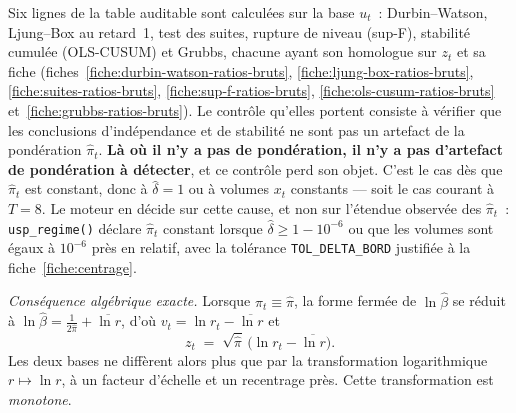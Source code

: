 \documentclass[a4paper,11pt]{article}
\newcommand{\code}[1]{\texttt{\small #1}}
\begin{document}
Six lignes de la table auditable sont calculées sur la base $u_t$~:
Durbin--Watson, Ljung--Box au retard~1, test des suites, rupture de niveau
(sup-F), stabilité cumulée (OLS-CUSUM) et Grubbs, chacune ayant son homologue
sur $z_t$ et sa fiche (fiches~\ref{fiche:durbin-watson-ratios-bruts},
\ref{fiche:ljung-box-ratios-bruts}, \ref{fiche:suites-ratios-bruts},
\ref{fiche:sup-f-ratios-bruts}, \ref{fiche:ols-cusum-ratios-bruts}
et~\ref{fiche:grubbs-ratios-bruts}). Le contrôle qu'elles portent consiste à vérifier que les conclusions
d'indépendance et de stabilité ne sont pas un artefact de la pondération
$\hat\pi_t$. \textbf{Là où il n'y a pas de pondération, il n'y a pas d'artefact
de pondération à détecter}, et ce contrôle perd son objet. C'est le cas dès que
$\hat\pi_t$ est constant, donc à $\hat\delta = 1$ ou à volumes $x_t$ constants
--- soit le cas courant à $T = 8$. Le moteur en décide sur cette cause, et non
sur l'étendue observée des $\hat\pi_t$~: \code{usp\_regime()} déclare
$\hat\pi_t$ constant lorsque $\hat\delta \ge 1 - 10^{-6}$ ou que les volumes
sont égaux à $10^{-6}$ près en relatif, avec la tolérance
\code{TOL\_DELTA\_BORD} justifiée à la fiche~\ref{fiche:centrage}.

\emph{Conséquence algébrique exacte.} Lorsque $\hat\pi_t \equiv \hat\pi$, la
forme fermée de $\ln\hat\beta$ se réduit à
$\ln\hat\beta = \tfrac{1}{2\hat\pi} + \overline{\ln r}$, d'où
$v_t = \ln r_t - \overline{\ln r}$ et
\[
  z_t \;=\; \sqrt{\hat\pi}\,\big(\ln r_t - \overline{\ln r}\big).
\]
Les deux bases ne diffèrent alors plus que par la transformation logarithmique
$r \mapsto \ln r$, à un facteur d'échelle et un recentrage près. Cette
transformation est \emph{monotone}.
\end{document}
